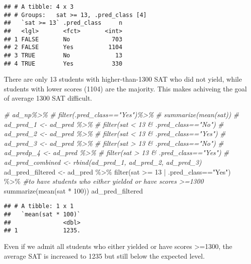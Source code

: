 \documentclass[
]{article}
\newenvironment{Shaded}{\begin{snugshade}}{\end{snugshade}}
\newcommand{\CommentTok}[1]{\textcolor[rgb]{0.56,0.35,0.01}{\textit{#1}}}
\newcommand{\DecValTok}[1]{\textcolor[rgb]{0.00,0.00,0.81}{#1}}
\newcommand{\FunctionTok}[1]{\textcolor[rgb]{0.00,0.00,0.00}{#1}}
\newcommand{\NormalTok}[1]{#1}
\newcommand{\OtherTok}[1]{\textcolor[rgb]{0.56,0.35,0.01}{#1}}
\newcommand{\SpecialCharTok}[1]{\textcolor[rgb]{0.00,0.00,0.00}{#1}}
\newcommand{\StringTok}[1]{\textcolor[rgb]{0.31,0.60,0.02}{#1}}
\begin{document}
\begin{verbatim}
## # A tibble: 4 x 3
## # Groups:   sat >= 13, .pred_class [4]
##   `sat >= 13` .pred_class     n
##   <lgl>       <fct>       <int>
## 1 FALSE       No            703
## 2 FALSE       Yes          1104
## 3 TRUE        No             13
## 4 TRUE        Yes           330
\end{verbatim}

There are only 13 students with higher-than-1300 SAT who did not yield,
while students with lower scores (1104) are the majority. This makes
achiveing the goal of average 1300 SAT difficult.

\begin{Shaded}
\begin{Highlighting}[]
\CommentTok{\# ad\_np\%\textgreater{}\%}
\CommentTok{\#   filter(.pred\_class=="Yes")\%\textgreater{}\%}
\CommentTok{\#   summarize(mean(sat))}
\CommentTok{\# ad\_pred\_1 \textless{}{-} ad\_pred \%\textgreater{}\% }
\CommentTok{\#   filter(sat \textless{} 13 \& .pred\_class=="No")}
\CommentTok{\# ad\_pred\_2 \textless{}{-} ad\_pred \%\textgreater{}\%}
\CommentTok{\#   filter(sat \textless{} 13 \& .pred\_class=="Yes")}
\CommentTok{\# ad\_pred\_3 \textless{}{-} ad\_pred \%\textgreater{}\%}
\CommentTok{\#   filter(sat \textgreater{} 13 \& .pred\_class=="No")}
\CommentTok{\# ad\_predp\_4 \textless{}{-} ad\_pred \%\textgreater{}\%}
\CommentTok{\#   filter(sat \textgreater{} 13 \& .pred\_class=="Yes")}
\CommentTok{\# ad\_pred\_combined \textless{}{-} rbind(ad\_pred\_1, ad\_pred\_2, ad\_pred\_3)}
\NormalTok{ad\_pred\_filtered }\OtherTok{\textless{}{-}}\NormalTok{ ad\_pred }\SpecialCharTok{\%\textgreater{}\%}
  \FunctionTok{filter}\NormalTok{(sat }\SpecialCharTok{\textgreater{}=} \DecValTok{13} \SpecialCharTok{|}\NormalTok{ .pred\_class}\SpecialCharTok{==}\StringTok{"Yes"}\NormalTok{) }\SpecialCharTok{\%\textgreater{}\%} \CommentTok{\#to have students who either yielded or have scores \textgreater{}=1300}
  \FunctionTok{summarize}\NormalTok{(}\FunctionTok{mean}\NormalTok{(sat }\SpecialCharTok{*} \DecValTok{100}\NormalTok{))}
\NormalTok{ad\_pred\_filtered}
\end{Highlighting}
\end{Shaded}

\begin{verbatim}
## # A tibble: 1 x 1
##   `mean(sat * 100)`
##               <dbl>
## 1             1235.
\end{verbatim}

Even if we admit all students who either yielded or have scores
\textgreater=1300, the average SAT is increased to 1235 but still below
the expected level.
\end{document}
